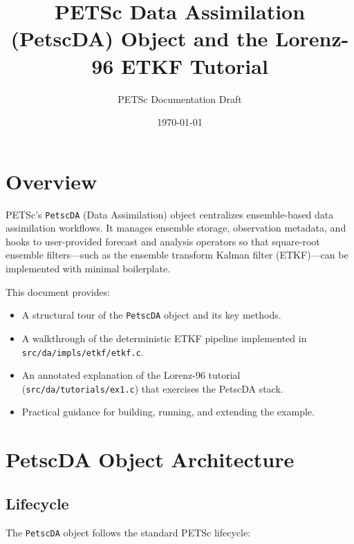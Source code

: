 \documentclass[11pt]{article}
\title{PETSc Data Assimilation (PetscDA) Object and the Lorenz-96 ETKF Tutorial}
\author{PETSc Documentation Draft}
\date{\today}
\begin{document}
\maketitle

\section{Overview}

PETSc's \texttt{PetscDA} (Data Assimilation) object centralizes ensemble-based data assimilation workflows. It manages ensemble storage, observation metadata, and hooks to user-provided forecast and analysis operators so that square-root ensemble filters---such as the ensemble transform Kalman filter (ETKF)---can be implemented with minimal boilerplate.

This document provides:

\begin{itemize}[nosep]
  \item A structural tour of the \texttt{PetscDA} object and its key methods.
  \item A walkthrough of the deterministic ETKF pipeline implemented in \texttt{src/da/impls/etkf/etkf.c}.
  \item An annotated explanation of the Lorenz-96 tutorial (\texttt{src/da/tutorials/ex1.c}) that exercises the PetscDA stack.
  \item Practical guidance for building, running, and extending the example.
\end{itemize}

\section{PetscDA Object Architecture}

\subsection{Lifecycle}

The \texttt{PetscDA} object follows the standard PETSc lifecycle:
\end{document}
